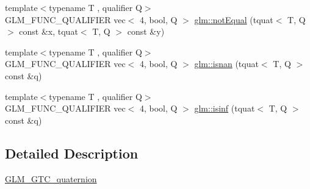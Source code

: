 \begin{DoxyCompactItemize}
\item 
{\footnotesize template$<$typename T , qualifier Q$>$ }\\G\+L\+M\+\_\+\+F\+U\+N\+C\+\_\+\+Q\+U\+A\+L\+I\+F\+I\+ER vec$<$ 4, bool, Q $>$ \hyperlink{group__gtc__quaternion_ga9494ec3489041958a240963a8a0ac9a0}{glm\+::not\+Equal} (tquat$<$ T, Q $>$ const \&x, tquat$<$ T, Q $>$ const \&y)
\item 
{\footnotesize template$<$typename T , qualifier Q$>$ }\\G\+L\+M\+\_\+\+F\+U\+N\+C\+\_\+\+Q\+U\+A\+L\+I\+F\+I\+ER vec$<$ 4, bool, Q $>$ \hyperlink{group__gtc__quaternion_ga31f4378ab97985177e208f4f4f8b1fd3}{glm\+::isnan} (tquat$<$ T, Q $>$ const \&q)
\item 
{\footnotesize template$<$typename T , qualifier Q$>$ }\\G\+L\+M\+\_\+\+F\+U\+N\+C\+\_\+\+Q\+U\+A\+L\+I\+F\+I\+ER vec$<$ 4, bool, Q $>$ \hyperlink{group__gtc__quaternion_ga139abc0f7f89553e341f8be95bf8d3cb}{glm\+::isinf} (tquat$<$ T, Q $>$ const \&q)
\end{DoxyCompactItemize}


\subsection{Detailed Description}
\hyperlink{group__gtc__quaternion}{G\+L\+M\+\_\+\+G\+T\+C\+\_\+quaternion} 